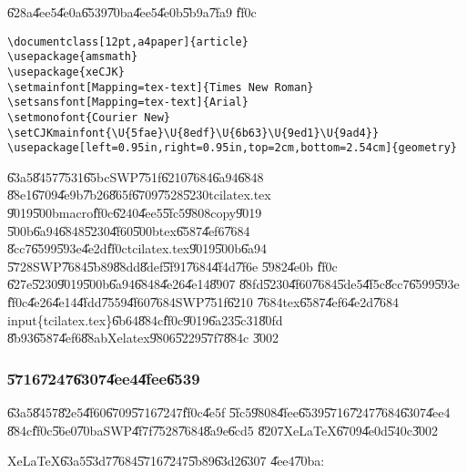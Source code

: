 \U{628a}\U{4ee5}\U{4e0a}\U{6539}\U{70ba}\U{4ee5}\U{4e0b}\U{5b9a}\U{7fa9}%
\U{ff0c}

\begin{mdframed}[leftline=false, rightline=false,backgroundcolor=bg]
\begin{verbatim}
\documentclass[12pt,a4paper]{article}
\usepackage{amsmath}
\usepackage{xeCJK}
\setmainfont[Mapping=tex-text]{Times New Roman}
\setsansfont[Mapping=tex-text]{Arial}
\setmonofont{Courier New} 
\setCJKmainfont{\U{5fae}\U{8edf}\U{6b63}\U{9ed1}\U{9ad4}}
\usepackage[left=0.95in,right=0.95in,top=2cm,bottom=2.54cm]{geometry}
\end{verbatim}
\end{mdframed}

\U{63a5}\U{8457}\U{7531}\U{65bc}SWP\U{751f}\U{6210}\U{7684}\U{6a94}\U{6848}%
\U{88e1}\U{6709}\U{4e9b}\U{7b26}\U{865f}\U{6709}\U{7528}\U{5230}tcilatex.tex%
\U{9019}\U{500b}macro\U{ff0c}\U{6240}\U{4ee5}\U{5fc5}\U{9808}copy\U{9019}%
\U{500b}\U{6a94}\U{6848}\U{5230}\U{4f60}\U{500b}tex\U{6587}\U{4ef6}\U{7684}%
\U{8cc7}\U{6599}\U{593e}\U{4e2d}\U{ff0c}tcilatex.tex\U{9019}\U{500b}\U{6a94}%
\U{5728}SWP\U{7684}\U{5b89}\U{88dd}\U{8def}\U{5f91}\U{7684}\U{4f4d}\U{7f6e}%
\U{5982}\U{4e0b}\newline
\underline{\color{blue}}\U{ff0c}%
\U{627e}\U{5230}\U{9019}\U{500b}\U{6a94}\U{6848}\U{4e26}\U{4e14}\U{8907}%
\U{88fd}\U{5230}\U{4f60}\U{7684}\U{5de5}\U{4f5c}\U{8cc7}\U{6599}\U{593e}%
\U{ff0c}\U{4e26}\U{4e14}\U{4fdd}\U{7559}\U{4f60}\U{7684}SWP\U{751f}\U{6210}%
\U{7684}tex\U{6587}\U{4ef6}\U{4e2d}\U{7684}\TEXTsymbol{\backslash}%
input\{tcilatex.tex\}\U{6b64}\U{884c}\U{ff0c}\U{9019}\U{6a23}\U{5c31}\U{80fd}%
\U{8b93}\U{6587}\U{4ef6}\U{88ab}Xelatex\U{9806}\U{5229}\U{57f7}\U{884c}%
\U{3002}

\subsubsection{\U{5716}\U{7247}\U{6307}\U{4ee4}\U{4fee}\U{6539}}

\U{63a5}\U{8457}\U{82e5}\U{4f60}\U{6709}\U{5716}\U{7247}\U{ff0c}\U{4e5f}%
\U{5fc5}\U{9808}\U{4fee}\U{6539}\U{5716}\U{7247}\U{7684}\U{6307}\U{4ee4}%
\U{884c}\U{ff0c}\U{56e0}\U{70ba}SWP\U{4f7f}\U{7528}\U{7684}\U{8a9e}\U{6cd5}%
\U{8207}XeLaTeX\U{6709}\U{4e0d}\U{540c}\U{3002}

XeLaTeX\U{63a5}\U{53d7}\U{7684}\U{5716}\U{7247}\U{5b89}\U{63d2}\U{6307}%
\U{4ee4}\U{70ba}:

